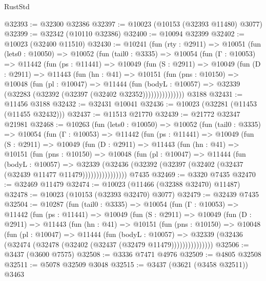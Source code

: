 \begin{lexlean}{RustStd}
\begin{coremodule}
@32393 := @32300 @32386
@32397 := @10023 (@10153 (@32393 @11480) @3077)
@32399 := @32342 (@10110 @32386)
@32400 := @10094 @32399
@32402 := @10023 (@32400 @11510)
@32430 := @10241
    (fun (rty : @2911) =>
    @10051
      (fun (lets0 : @10050) =>
      @10052
        (fun (tail0 : @3335) =>
        @10054
          (fun (Γ : @10053) =>
          @11442
            (fun (ps : @11441) =>
            @10049
              (fun (S : @2911) =>
              @10049
                (fun (D : @2911) =>
                @11443
                  (fun (hn : @41) =>
                  @10151
                    (fun (pns : @10150) =>
                    @10048
                      (fun (pl : @10047) =>
                      @11444
                        (fun (bodyL : @10057) =>
                        @32339 (@32283 (@32392 (@32397 (@32402 @32352)))))))))))))))
    @3188
@32431 := @11456 @3188
@32432 := @32431 @10041
@32436 := @10023 (@32281 (@11453 (@11455 @32432)))
@32437 := @11513 @21770
@32439 := @21772 @32347 @21981
@32468 := @10263
    (fun (lets0 : @10050) =>
    @10052
      (fun (tail0 : @3335) =>
      @10054
        (fun (Γ : @10053) =>
        @11442
          (fun (ps : @11441) =>
          @10049
            (fun (S : @2911) =>
            @10049
              (fun (D : @2911) =>
              @11443
                (fun (hn : @41) =>
                @10151
                  (fun (pns : @10150) =>
                  @10048
                    (fun (pl : @10047) =>
                    @11444
                      (fun (bodyL : @10057) =>
                      @32339
                        (@32436
                          (@32392 (@32397 (@32402 (@32437 (@32439 @11477 @11479))))))))))))))))
    @7435
@32469 := @3320 @7435
@32470 := @32469 @11479
@32474 := @10023 (@11466 (@32388 @32470) @11487)
@32478 := @10023 (@10153 (@32393 @32470) @3077)
@32479 := @32439 @7435
@32504 := @10287
    (fun (tail0 : @3335) =>
    @10054
      (fun (Γ : @10053) =>
      @11442
        (fun (ps : @11441) =>
        @10049
          (fun (S : @2911) =>
          @10049
            (fun (D : @2911) =>
            @11443
              (fun (hn : @41) =>
              @10151
                (fun (pns : @10150) =>
                @10048
                  (fun (pl : @10047) =>
                  @11444
                    (fun (bodyL : @10057) =>
                    @32339 (@32436 (@32474 (@32478 (@32402 (@32437 (@32479 @11479)))))))))))))))
@32506 := @3437 (@3600 @7575)
@32508 := @3336 @7471 @4976
@32509 := @4805 @32508
@32511 := @5078 @32509 @3048
@32515 := @3437 (@3621 (@3458 @32511)) @3463

\end{coremodule}
\end{lexlean}

